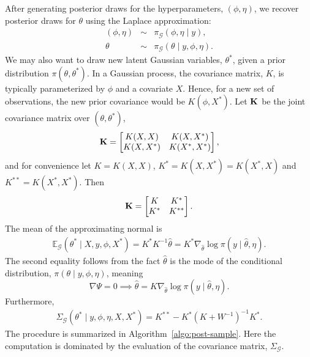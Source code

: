 \documentclass[stslayout, noinfoline]{imsart}
\theoremstyle{definition}
\begin{document}
After generating posterior draws for the hyperparameters, $(\phi, \eta)$,
we recover posterior draws for $\theta$ using the Laplace approximation:
\begin{eqnarray*}
  (\phi, \eta) & \sim & \pi_\mathcal{G}(\phi, \eta \mid y), \\
  \theta & \sim & \pi_\mathcal{G} ( \theta \mid y, \phi, \eta).
\end{eqnarray*}
%
We may also want to draw new latent Gaussian variables, $\theta^*$,
given a prior distribution $\pi(\theta, \theta^*)$.
In a Gaussian process, the covariance matrix, $K$, is typically parameterized by $\phi$ and a covariate $X$.
Hence, for a new set of observations, the new prior covariance would be $K(\phi, X^*)$.
Let $\bf K$ be the joint covariance matrix over $(\theta, \theta^*)$,
\begin{equation*}
  {\bf K} = \begin{bmatrix}
  K(X, X) & K(X, X^*)\\
  K(X, X^*) & K(X^*, X^*)
  \end{bmatrix},
\end{equation*}
and for convenience let $K = K(X, X)$, $K^* = K(X, X^*) = K(X^*, X)$ and $K^{**} = K(X^*, X^*)$.
Then
\begin{equation*}
{\bf K} = \begin{bmatrix}
K & K^*\\
K^* & K^{**}
\end{bmatrix}.
\end{equation*}
%
%
The mean of the approximating normal is
%
\begin{eqnarray*}
  \mathbb E_\mathcal{G} (\theta^* \mid X, y, \phi, X^*) = K^*K^{-1} \hat \theta = K^* \nabla_{\hat \theta} \log \pi(y \mid \hat \theta, \eta).
\end{eqnarray*}
%
The second equality follows from the fact $\hat \theta$ is the mode of the conditional distribution, $\pi(\theta \mid y, \phi, \eta)$, meaning
\begin{equation*}
  \nabla \Psi = 0 \implies \hat \theta = K \nabla_{\hat \theta} \log \pi(y \mid \hat \theta, \eta).
\end{equation*}
%
Furthermore,
\begin{eqnarray*}
  \Sigma_\mathcal{G}(\theta^* \mid y, \phi, \eta, X, X^*) = K^{**} - K^* (K + W^{-1})^{-1} K^*.
\end{eqnarray*}
%
The procedure is summarized in Algorithm~\ref{algo:post-sample}.
Here the computation is dominated by the evaluation of the covariance matrix, $\Sigma_\mathcal{G}$.
\end{document}
